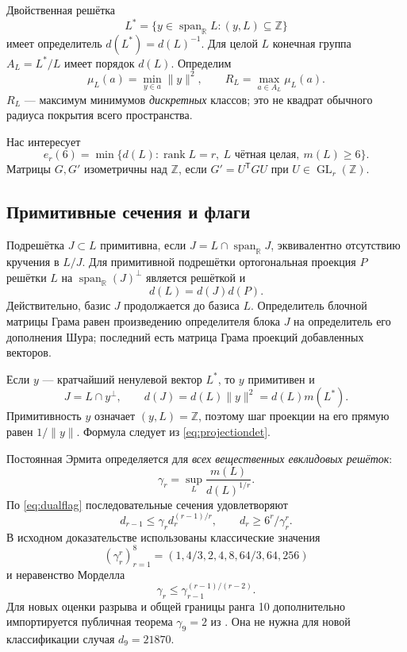 \documentclass[11pt,a4paper]{article}
\theoremstyle{remark}\newtheorem{remark}[theorem]{Замечание}
\newcommand{\Z}{\mathbb Z}\newcommand{\R}{\mathbb R}\newcommand{\F}{\mathbb F}
\newcommand{\GL}{\operatorname{GL}}\newcommand{\rank}{\operatorname{rank}}
\newcommand{\spanR}{\operatorname{span}_{\R}}\newcommand{\diag}{\operatorname{diag}}
\begin{document}
Двойственная решётка
\[
L^*=\{y\in\spanR L:(y,L)\subseteq\Z\}
\]
имеет определитель $d(L^*)=d(L)^{-1}$. Для целой $L$ конечная группа $A_L=L^*/L$ имеет порядок $d(L)$. Определим
\[
\mu_L(a)=\min_{y\in a}\|y\|^2,\qquad
R_L=\max_{a\in A_L}\mu_L(a).
\]
$R_L$ --- максимум минимумов \emph{дискретных} классов; это не квадрат обычного радиуса покрытия всего пространства.

Нас интересует
\[
e_r(6)=\min\{d(L):\rank L=r,\ L\text{ чётная целая},\ m(L)\ge6\}.
\]
Матрицы $G,G'$ изометричны над $\Z$, если $G'=U^{\mathsf T}GU$ при $U\in\GL_r(\Z)$.

\subsection{Примитивные сечения и флаги}

Подрешётка $J\subset L$ примитивна, если $J=L\cap\spanR J$, эквивалентно отсутствию кручения в $L/J$. Для примитивной подрешётки ортогональная проекция $P$ решётки $L$ на $\spanR(J)^\perp$ является решёткой и
\begin{equation}\label{eq:projectiondet}
d(L)=d(J)d(P).
\end{equation}
Действительно, базис $J$ продолжается до базиса $L$. Определитель блочной матрицы Грама равен произведению определителя блока $J$ на определитель его дополнения Шура; последний есть матрица Грама проекций добавленных векторов.

Если $y$ --- кратчайший ненулевой вектор $L^*$, то $y$ примитивен и
\begin{equation}\label{eq:dualflag}
J=L\cap y^\perp,\qquad d(J)=d(L)\|y\|^2=d(L)m(L^*).
\end{equation}
Примитивность $y$ означает $(y,L)=\Z$, поэтому шаг проекции на его прямую равен $1/\|y\|$. Формула следует из \eqref{eq:projectiondet}.

Постоянная Эрмита определяется для \emph{всех вещественных евклидовых решёток}:
\[
\gamma_r=\sup_L\frac{m(L)}{d(L)^{1/r}}.
\]
По \eqref{eq:dualflag} последовательные сечения удовлетворяют
\begin{equation}\label{eq:windows}
d_{r-1}\le\gamma_r d_r^{(r-1)/r},\qquad
d_r\ge6^r/\gamma_r^r.
\end{equation}
В исходном доказательстве использованы классические значения
\[
(\gamma_r^r)_{r=1}^8=(1,4/3,2,4,8,64/3,64,256)
\]
и неравенство Морделла
\begin{equation}\label{eq:mordell}
\gamma_r\le\gamma_{r-1}^{(r-1)/(r-2)}.
\end{equation}
Для новых оценки разрыва и общей границы ранга 10 дополнительно импортируется публичная теорема $\gamma_9=2$ из \cite{dw}. Она не нужна для новой классификации случая $d_9=21870$.
\end{document}
